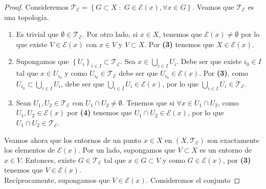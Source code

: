\begin{proof}
	Consideremos $\displaystyle \mathcal{T}_{\mathcal{E}}= \left\{ G \subset X \; : \; G \in \mathcal{E}\left(x\right), \forall x \in G\right\}  $. Veamos que $\displaystyle \mathcal{T}_{\mathcal{E}} $ es una topología.
	\begin{enumerate}
	\item Es trivial que $\displaystyle \emptyset \in \mathcal{T}_{\mathcal{E}} $. Por otro lado, si $\displaystyle x \in X $, tenemos que $\displaystyle \mathcal{E}\left(x\right)\neq \emptyset $ por lo que existe $\displaystyle V \in \mathcal{E}\left(x\right) $ con $\displaystyle x \in V  $ y $\displaystyle V \subset X $. Por \textbf{(3)} tenemos que $\displaystyle X \in \mathcal{E}\left(x\right) $.
	\item Supongamos que $\displaystyle \left\{ U_{i}\right\} _{i \in I}\subset \mathcal{T}_{\mathcal{E}} $. Sea $\displaystyle x \in \bigcup_{i \in I}U_{i} $. Debe ser que existe $\displaystyle i_{0} \in I $ tal que $\displaystyle x \in U_{i_{0}} $ y como $\displaystyle U_{i_{0}}\in \mathcal{T}_{\mathcal{E}} $ debe ser que $\displaystyle U_{i_{0}}\in \mathcal{E}\left(x\right) $. Por \textbf{(3)}, como $\displaystyle U_{i_{0}}\subset \bigcup_{i \in I}U_{i} $, debe ser que $\displaystyle \bigcup_{i \in I}U_{i} \in \mathcal{E}\left(x\right) $, por lo que $\displaystyle \bigcup_{i \in I}U_{i} \in \mathcal{T}_{\mathcal{E}} $. 
	\item Sean $\displaystyle U_{1}, U_{2} \in \mathcal{T}_{\mathcal{E}} $ con $\displaystyle U_{1} \cap U_{2} \neq \emptyset $. Tenemos que si $\displaystyle \forall x \in U_{1} \cap U_{2} $, como $\displaystyle U_{1}, U_{2} \in \mathcal{E}\left(x\right) $ por \textbf{(4)} tenemos que $\displaystyle U_{1} \cap U_{2} \in \mathcal{E}\left(x\right) $, por lo que $\displaystyle U_{1} \cap U_{2} \in \mathcal{T}_{\mathcal{E}} $. 
	\end{enumerate}
	Veamos ahora que los entornos de un punto $\displaystyle x \in X $ en $\displaystyle \left(X, \mathcal{T}_{\mathcal{E}}\right) $ son exactamente los elementos de $\displaystyle \mathcal{E}\left(x\right) $. Por un lado, supongamos que $\displaystyle V \subset X$ es un entorno de $\displaystyle x \in V $. Entonces, existe $\displaystyle G \in \mathcal{T}_{\mathcal{E}} $ tal que $\displaystyle x \in G \subset V $ y como $\displaystyle G \in \mathcal{E}\left(x\right) $, por \textbf{(3)} tenemos que $\displaystyle V \in \mathcal{E}\left(x\right) $. \\
	Recíprocamente, supongamos que $\displaystyle V \in \mathcal{E}\left(x\right) $. Consideremos el conjunto  

\end{proof}
